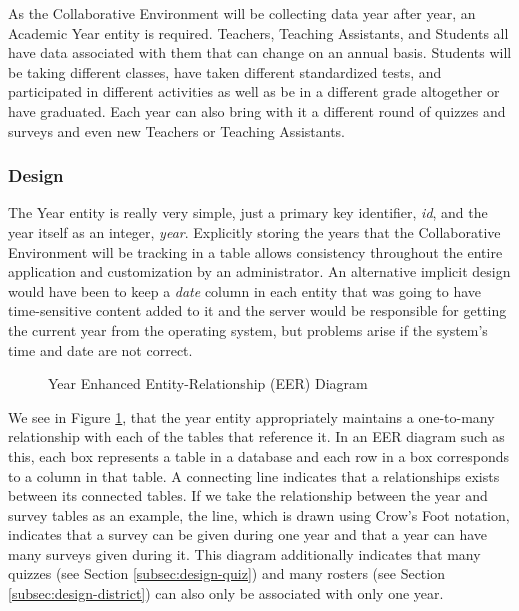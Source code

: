 As the Collaborative Environment will be collecting data year after year, an Academic Year entity is required. Teachers, Teaching Assistants, and Students all have data associated with them that can change on an annual basis. Students will be taking different classes, have taken different standardized tests, and participated in different activities as well as be in a different grade altogether or have graduated. Each year can also bring with it a different round of quizzes and surveys and even new Teachers or Teaching Assistants.


\subsubsection{Design}
The Year entity is really very simple, just a primary key identifier, \emph{id}, and the year itself as an integer, \emph{year}. Explicitly storing the years that the Collaborative Environment will be tracking in a table allows consistency throughout the entire application and customization by an administrator. An alternative implicit design would have been to keep a \emph{date} column in each entity that was going to have time-sensitive content added to it and the server would be responsible for getting the current year from the operating system, but problems arise if the system's time and date are not correct. 

\begin{figure}[h!]
	\centering
	\caption{Year Enhanced Entity-Relationship (EER) Diagram}
	\label{fig:er-year}
\end{figure}

We see in Figure \ref{fig:er-year}, that the year entity appropriately maintains a one-to-many relationship with each of the tables that reference it. In an EER diagram such as this, each box represents a table in a database and each row in a box corresponds to a column in that table. A connecting line indicates that a relationships exists between its connected tables. If we take the relationship between the year and survey tables as an example, the line, which is drawn using Crow's Foot notation, indicates that a survey can be given during one year and that a year can have many surveys given during it. This diagram additionally indicates that many quizzes (see Section \ref{subsec:design-quiz}) and many rosters (see Section \ref{subsec:design-district}) can also only be associated with only one year.


